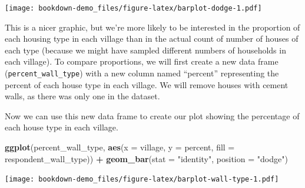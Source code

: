 \documentclass[]{book}
\newenvironment{Shaded}{\begin{snugshade}}{\end{snugshade}}
\newcommand{\KeywordTok}[1]{\textcolor[rgb]{0.13,0.29,0.53}{\textbf{#1}}}
\newcommand{\DataTypeTok}[1]{\textcolor[rgb]{0.13,0.29,0.53}{#1}}
\newcommand{\StringTok}[1]{\textcolor[rgb]{0.31,0.60,0.02}{#1}}
\newcommand{\OperatorTok}[1]{\textcolor[rgb]{0.81,0.36,0.00}{\textbf{#1}}}
\newcommand{\NormalTok}[1]{#1}
\begin{document}
\texttt{[image: bookdown-demo\_files/figure-latex/barplot-dodge-1.pdf]}

This is a nicer graphic, but we're more likely to be interested in the
proportion of each housing type in each village than in the actual count
of number of houses of each type (because we might have sampled
different numbers of households in each village). To compare
proportions, we will first create a new data frame
(\texttt{percent\_wall\_type}) with a new column named ``percent''
representing the percent of each house type in each village. We will
remove houses with cement walls, as there was only one in the dataset.

\begin{Shaded}
\end{Shaded}

Now we can use this new data frame to create our plot showing the
percentage of each house type in each village.

\begin{Shaded}
\begin{Highlighting}[]
 \KeywordTok{ggplot}\NormalTok{(percent_wall_type, }\KeywordTok{aes}\NormalTok{(}\DataTypeTok{x =}\NormalTok{ village, }\DataTypeTok{y =}\NormalTok{ percent, }\DataTypeTok{fill =}\NormalTok{ respondent_wall_type)) }\OperatorTok{+}
\StringTok{     }\KeywordTok{geom_bar}\NormalTok{(}\DataTypeTok{stat =} \StringTok{"identity"}\NormalTok{, }\DataTypeTok{position =} \StringTok{"dodge"}\NormalTok{)}
\end{Highlighting}
\end{Shaded}

\texttt{[image: bookdown-demo\_files/figure-latex/barplot-wall-type-1.pdf]}
\end{document}
